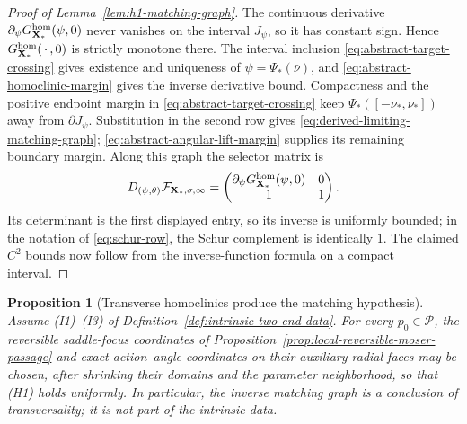 \documentclass[11pt]{amsart}
\numberwithin{equation}{section}
\newtheorem{proposition}[theorem]{Proposition}
\theoremstyle{definition}
\theoremstyle{remark}
\begin{document}
\begin{proof}[Proof of Lemma~\ref{lem:h1-matching-graph}]
The continuous derivative
$\partial_\psi G^{\rm hom}_{\mathbf X_*}(\psi,0)$ never vanishes on the
interval $J_\psi$, so it has constant sign.  Hence
$G^{\rm hom}_{\mathbf X_*}(\,\cdot\,,0)$ is strictly monotone there.
The interval inclusion \eqref{eq:abstract-target-crossing} gives existence
and uniqueness of $\psi=\Psi_*(\bar\nu)$, and
\eqref{eq:abstract-homoclinic-margin} gives the inverse derivative bound.
Compactness and the positive endpoint margin in
\eqref{eq:abstract-target-crossing} keep $\Psi_*([-\nu_*,\nu_*])$ away
from $\partial J_\psi$.  Substitution in the second row gives
\eqref{eq:derived-limiting-matching-graph};
\eqref{eq:abstract-angular-lift-margin} supplies its remaining boundary
margin.  Along this graph the selector matrix is
\begin{equation}\label{eq:h1-selector-matrix}
 D_{(\psi,\theta)}\mathcal F_{\mathbf X_*,\sigma,\infty}
 =\begin{pmatrix}
   \partial_\psi G^{\rm hom}_{\mathbf X_*}(\psi,0)&0\\
   1&1
  \end{pmatrix}.
\end{equation}
Its determinant is the first displayed entry, so its inverse is uniformly
bounded; in the notation of \eqref{eq:schur-row}, the Schur complement is
identically $1$.  The claimed $C^2$ bounds now follow from the
inverse-function formula on a compact interval.
\end{proof}

\begin{proposition}[Transverse homoclinics produce the matching hypothesis]
\label{prop:transverse-homoclinic-produces-h1}
Assume \textup{(I1)}--\textup{(I3)} of
Definition~\ref{def:intrinsic-two-end-data}.  For every $p_0\in\mathcal P$,
the reversible saddle-focus coordinates of
Proposition~\ref{prop:local-reversible-moser-passage} and exact
action--angle coordinates on their auxiliary radial faces may be chosen,
after shrinking their domains and the parameter neighborhood, so that
\textup{(H1)} holds uniformly.  In particular, the inverse matching graph
is a conclusion of transversality; it is not part of the intrinsic data.
\end{proposition}
\end{document}
